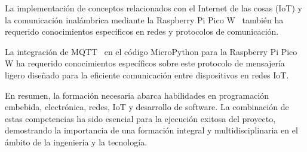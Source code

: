 La implementación de conceptos relacionados con el Internet de las cosas (IoT) y la comunicación inalámbrica mediante la Raspberry Pi Pico W~\cite{misc:RPiPicoW} también ha requerido conocimientos específicos en redes y protocolos de comunicación.

La integración de MQTT~\cite{MQTT} en el código MicroPython para la Raspberry Pi Pico W ha requerido conocimientos específicos sobre este protocolo de mensajería ligero diseñado para la eficiente comunicación entre dispositivos en redes IoT.

En resumen, la formación necesaria abarca habilidades en programación embebida, electrónica, redes, IoT y desarrollo de software. La combinación de estas competencias ha sido esencial para la ejecución exitosa del proyecto, demostrando la importancia de una formación integral y multidisciplinaria en el ámbito de la ingeniería y la tecnología.
\pagebreak

